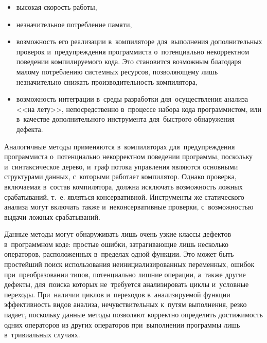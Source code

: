 \begin{itemize}
 \item высокая скорость работы,
 \item незначительное потребление памяти,
 \item возможность его реализации в~компиляторе для~выполнения дополнительных проверок и~предупреждения программиста о~потенциально некорректном поведении компилируемого кода. Это становится возможным благодаря малому потреблению системных ресурсов, позволяющему лишь незначительно снижать производительность компилятора,
 \item возможность интеграции в~среды разработки для~осуществления анализа <<на лету>>, непосредственно в~процессе набора кода программистом, или в~качестве дополнительного инструмента для~быстрого обнаружения дефекта.
\end{itemize}

Аналогичные методы применяются в~компиляторах для~предупреждения программиста о~потенциально некорректном поведении программы, поскольку и~синтаксическое дерево, и~граф потока управления являются основными структурами данных, с~которыми работает компилятор. Однако проверка, включаемая в~состав компилятора, должна исключать возможность ложных срабатываний, т.~е. являться консервативной. Инструменты же статического анализа могут включать также и~неконсервативные проверки, с~возможностью выдачи ложных срабатываний.

Данные методы могут обнаруживать лишь очень узкие классы дефектов в~программном коде: простые ошибки, затрагивающие лишь несколько операторов, расположенных в~пределах одной функции. Это может быть простейший поиск использования неинициализированных переменных, ошибок при~преобразовании типов, потенциально лишние операции, а~также другие дефекты, для~поиска которых не~требуется анализировать циклы и~условные переходы. При~наличии циклов и~переходов в~анализируемой функции эффективность видов анализа, нечувствительных к~путям выполнения, резко падает, поскольку данные методы позволяют корректно определить достижимость одних операторов из других операторов при~выполнении программы лишь в~тривиальных случаях.

